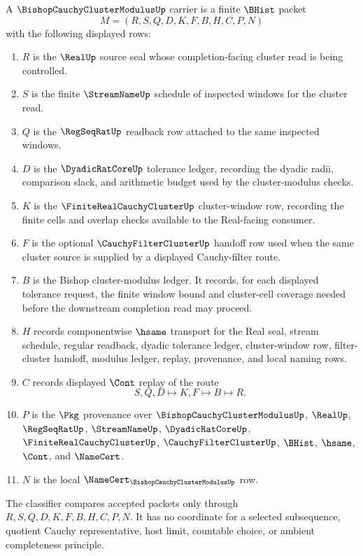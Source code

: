 \begin{definition}
\label{def:bishop-cauchy-cluster-modulus-carrier}
A $\BishopCauchyClusterModulusUp$ carrier is a finite $\BHist$ packet
$$
M=(R,S,Q,D,K,F,B,H,C,P,N)
$$
with the following displayed rows:
\begin{enumerate}
\item $R$ is the $\RealUp$ source seal whose completion-facing cluster read is being controlled.
\item $S$ is the finite $\StreamNameUp$ schedule of inspected windows for the cluster read.
\item $Q$ is the $\RegSeqRatUp$ readback row attached to the same inspected windows.
\item $D$ is the $\DyadicRatCoreUp$ tolerance ledger, recording the dyadic radii, comparison slack, and arithmetic budget used by the cluster-modulus checks.
\item $K$ is the $\FiniteRealCauchyClusterUp$ cluster-window row, recording the finite cells and overlap checks available to the Real-facing consumer.
\item $F$ is the optional $\CauchyFilterClusterUp$ handoff row used when the same cluster source is supplied by a displayed Cauchy-filter route.
\item $B$ is the Bishop cluster-modulus ledger. It records, for each displayed tolerance request, the finite window bound and cluster-cell coverage needed before the downstream completion read may proceed.
\item $H$ records componentwise $\hsame$ transport for the Real seal, stream schedule, regular readback, dyadic tolerance ledger, cluster-window row, filter-cluster handoff, modulus ledger, replay, provenance, and local naming rows.
\item $C$ records displayed $\Cont$ replay of the route
$$
S,Q,D \longmapsto K,F \longmapsto B \longmapsto R .
$$
\item $P$ is the $\Pkg$ provenance over $\BishopCauchyClusterModulusUp$, $\RealUp$, $\RegSeqRatUp$, $\StreamNameUp$, $\DyadicRatCoreUp$, $\FiniteRealCauchyClusterUp$, $\CauchyFilterClusterUp$, $\BHist$, $\hsame$, $\Cont$, and $\NameCert$.
\item $N$ is the local $\NameCert_{\BishopCauchyClusterModulusUp}$ row.
\end{enumerate}
The classifier compares accepted packets only through $R,S,Q,D,K,F,B,H,C,P,N$. It has no coordinate for a selected subsequence, quotient Cauchy representative, host limit, countable choice, or ambient completeness principle.
\end{definition}

